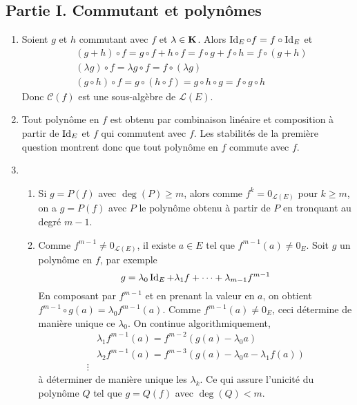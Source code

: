 \subsection*{Partie I. Commutant et polynômes}
\begin{enumerate}
 \item Soient $g$ et $h$ commutant avec $f$ et $\lambda\in \mathbf{K}$. Alors $\operatorname{Id}_E \circ f = f\circ \operatorname{Id}_E$ et
\begin{align*}
 &(g+h)\circ f = g\circ f + h\circ f =f\circ g + f\circ h=f\circ (g+h)\\
 &(\lambda g)\circ f = \lambda g\circ f = f\circ (\lambda g) \\
 &(g\circ h)\circ f = g\circ(h\circ f)=g\circ h \circ g = f\circ g \circ h
\end{align*}
 Donc $\mathcal{C}(f)$ est une sous-algèbre de $\mathcal{L}(E)$.
 \item Tout polynôme en $f$ est obtenu par combinaison linéaire et composition à partir de $\operatorname{Id}_E$ et $f$ qui commutent avec $f$. Les stabilités de la première question montrent donc que tout polynôme en $f$ commute avec $f$.
 \item
\begin{enumerate}
 \item Si $g=P(f)$ avec $\deg(P)\geq m$, alors comme $f^k=0_{\mathcal{L}(E)}$ pour $k\geq m$, on a $g=P(f)$ avec $P$ le polynôme obtenu à partir de $P$ en tronquant au degré $m-1$. 
 \item Comme $f^{m-1}\neq 0_{\mathcal{L}(E)}$, il existe $a\in E$ tel que $f^{m-1}(a)\neq 0_E$.\newline
Soit $g$ un polynôme en $f$, par exemple
\begin{displaymath}
 g= \lambda_0 \operatorname{Id}_E + \lambda_1 f+\cdots +\lambda_{m-1}f^{m-1}
\end{displaymath}
En composant par $f^{m-1}$ et en prenant la valeur en $a$, on obtient $f^{m-1}\circ g(a) = \lambda_0 f^{m-1}(a)$. Comme $f^{m-1}(a)\neq 0_E$, ceci détermine de manière unique ce $\lambda_0$. On continue algorithmiquement,
\begin{align*}
 &\lambda_1 f^{m-1}(a) = f^{m-2}\left(g(a)-\lambda_0 a \right)\\
 &\lambda_2 f^{m-1}(a) = f^{m-3}\left(g(a)-\lambda_0 a -\lambda_1 f(a) \right)\\
 \vdots
\end{align*}
à déterminer de manière unique les $\lambda_k$. Ce qui assure l'unicité du polynôme $Q$ tel que $g=Q(f)$ avec $\deg(Q)<m$.
\end{enumerate}

\end{enumerate}

